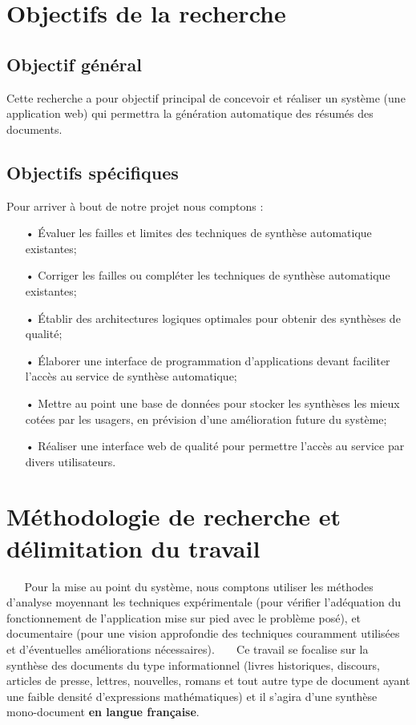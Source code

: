\section{Objectifs de la recherche}
\subsection{Objectif général}
Cette recherche a pour objectif principal de concevoir et réaliser un système (une ap\-pli\-ca\-tion web) qui permettra la génération automatique des résumés des documents.
\subsection{Objectifs spécifiques}
Pour arriver à bout de notre projet nous comptons :
\begin{itemize}
\item[•] Évaluer les failles et limites des techniques de synthèse automatique existantes;
\item[•] Corriger les failles ou compléter les techniques de synthèse automatique existantes;
\item[•] Établir des architectures logiques optimales pour obtenir des synthèses de qualité;
\item[•] Élaborer une interface de programmation d'applications devant faciliter l'accès au service de synthèse automatique;
\item[•] Mettre au point une base de données pour stocker les synthèses les mieux cotées par les usagers, en prévision d'une amélioration future du système;
\item[•] Réaliser une interface web de qualité pour permettre l'accès au service par divers utilisateurs.
\end{itemize}\newpage
\section{Méthodologie de recherche et délimitation du travail}
$ _{} $ $ _{} $ $ _{} $ $ _{} $ $ _{} $Pour la mise au point du système, nous comptons utiliser les méthodes d'analyse moyennant les techniques expérimentale (pour vérifier l'adéquation du fonctionnement de l'application mise sur pied avec le problème posé), et documentaire (pour une vision approfondie des techniques couramment utilisées et d'éventuelles améliorations nécessaires).
$ _{} $ $ _{} $ $ _{} $ $ _{} $ $ _{} $Ce travail se focalise sur la synthèse des documents du type informationnel (livres historiques, discours, articles de presse, lettres, nouvelles, romans et tout autre type de document ayant une faible densité d'expressions mathématiques) et il s'agira d'une synthèse mono-document \textbf{en langue française}.
